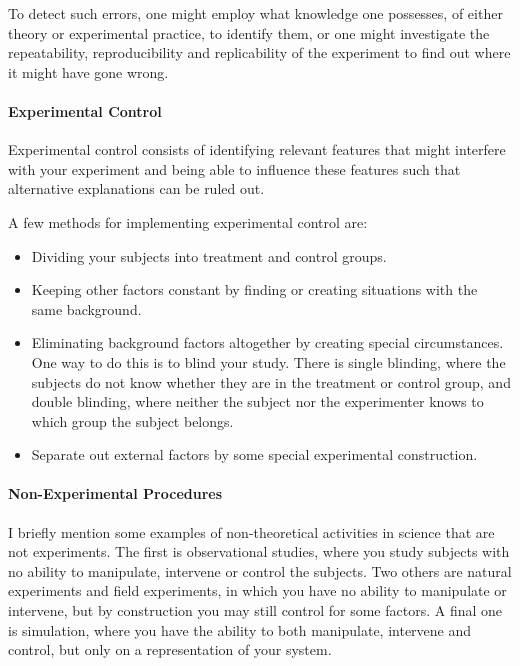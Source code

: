 To detect such errors, one might employ what knowledge one possesses, of either theory or experimental practice, to identify them, or one might investigate the repeatability, reproducibility and replicability of the experiment to find out where it might have gone wrong.

\paragraph{Experimental Control}
Experimental control consists of identifying relevant features that might interfere with your experiment and being able to influence these features such that alternative explanations can be ruled out.

A few methods for implementing experimental control are:
\begin{itemize}
	\item Dividing your subjects into treatment and control groups.
	\item Keeping other factors constant by finding or creating situations with the same background.
	\item Eliminating background factors altogether by creating special circumstances. One way to do this is to blind your study. There is single blinding, where the subjects do not know whether they are in the treatment or control group, and double blinding, where neither the subject nor the experimenter knows to which group the subject belongs.
	\item Separate out external factors by some special experimental construction.
\end{itemize}

\paragraph{Non-Experimental Procedures}
I briefly mention some examples of non-theoretical activities in science that are not experiments. The first is observational studies, where you study subjects with no ability to manipulate, intervene or control the subjects. Two others are natural experiments and field experiments, in which you have no ability to manipulate or intervene, but by construction you may still control for some factors. A final one is simulation, where you have the ability to both manipulate, intervene and control, but only on a representation of your system.


